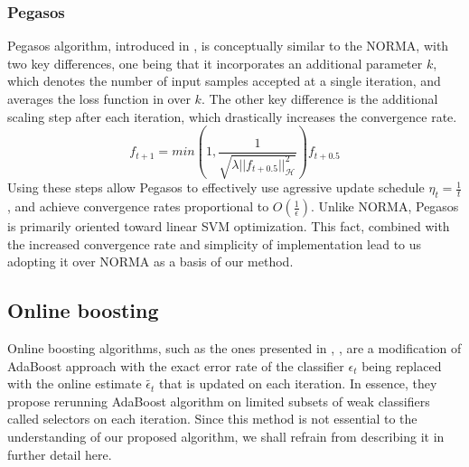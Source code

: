 \subsubsection{Pegasos}
\label{pegaSec}
Pegasos algorithm, introduced in \cite{Pegasos}, is conceptually similar to the NORMA, with two key differences,
one being that it incorporates an additional parameter $k$, which denotes the number of input samples accepted at a single iteration, and averages the loss function in  over $k$. The other key difference is the additional scaling step after each iteration, which drastically increases the convergence rate.
$$
f_{t+1}=min(1,\frac{1}{\sqrt{\lambda ||f_{t+0.5}||_{\mathscr{H}}^2}})f_{t+0.5}
$$
Using these steps allow Pegasos to effectively use agressive update schedule $\eta_t=\frac{1}{t}$, and achieve convergence rates proportional to $O(\frac{1}{\epsilon})$. 
Unlike NORMA, Pegasos is primarily oriented toward linear SVM optimization. This fact, combined with the increased convergence rate and simplicity of implementation lead to us adopting it over NORMA as a basis of our method. 

\subsection {Online boosting}

Online boosting algorithms, such as the ones presented in \cite{grabner2006}, \cite{grabner2008},  are a modification of AdaBoost approach with the exact error rate of the classifier $\epsilon_t$ being replaced with the online  estimate $\tilde{\epsilon_t}$ that is updated on each iteration. In essence, they propose rerunning AdaBoost algorithm on limited subsets of weak classifiers called selectors on each iteration. Since this method is not essential to the understanding of our proposed algorithm, we shall refrain from describing it in further detail here. 
